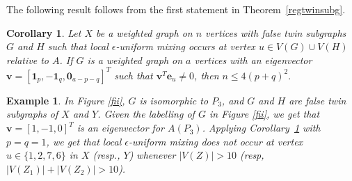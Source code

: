 \documentclass[11pt]{article}
\newtheorem{corollary}{Corollary}
\newtheorem{example}{Example}
\newcommand{\be}{\mathbf e}
\newcommand{\bv}{\mathbf v}
\newcommand{\one}{\mathbf 1}
\newcommand{\zero}{\mathbf 0}
\begin{document}
The following result follows from the first statement in Theorem~\ref{regtwinsubg}.

\begin{corollary}
\label{cor:pq}
Let $X$ be a weighted graph on $n$ vertices with false twin subgraphs $G$ and $H$ such that local $\epsilon$-uniform mixing occurs at vertex $u\in V(G)\cup V(H)$ relative to $A$. If $G$ is a weighted graph on $a$ vertices with an eigenvector $\bv=[\one_p,-\one_q,\zero_{a-p-q}]^T$ such that $\bv^T\be_u\neq 0$, then $n\leq 4(p+q)^2.$
\end{corollary}

\begin{example}
\label{ex1}
In Figure \ref{fii}, $G$ is isomorphic to $P_3$, and $G$ and $H$ are false twin subgraphs of $X$ and $Y$. Given the labelling of $G$ in Figure \ref{fii}, we get that $\bv=[1,-1,0]^T$ is an eigenvector for $A(P_3)$. Applying Corollary~\ref{cor:pq} with $p=q=1$, we get that local $\epsilon$-uniform mixing does not occur at vertex $u\in\{1,2,7,6\}$ in $X$ (resp., $Y$) whenever $|V(Z)|>10$ (resp, $|V(Z_1)|+|V(Z_2)|>10$).
\end{example}
\end{document}
